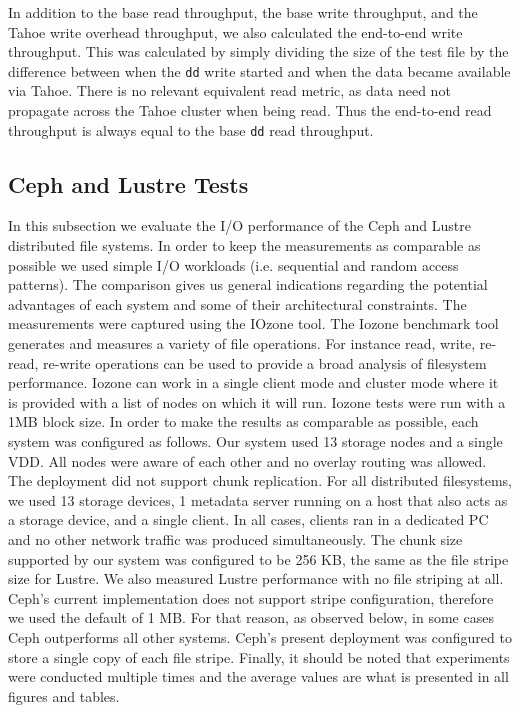 \documentclass[11pt]{article}
\begin{document}
In addition to the base read throughput, the base write throughput, and the Tahoe write
overhead throughput, we also calculated the end-to-end write
throughput. This was calculated by simply dividing the size of the
test file by the difference
between when the \texttt{dd} write started and when the data became
available via Tahoe. There is no relevant equivalent read metric, as data need
not propagate across the Tahoe cluster when being read. Thus the
end-to-end read throughput is always equal to the base \texttt{dd} read
throughput.

\subsection{Ceph and Lustre Tests}
In this subsection we evaluate the I/O performance of the Ceph and 
Lustre distributed file systems. In order to keep the measurements 
as comparable as possible we used simple I/O workloads (i.e. sequential 
and random access patterns). The comparison gives us general indications 
regarding the potential advantages of each system and some of their 
architectural constraints. The measurements were captured using the IOzone 
tool. The Iozone benchmark tool generates and measures a variety of file 
operations. For instance read, write, re-read, re-write operations can be 
used to provide a broad analysis of filesystem performance. Iozone can work 
in a single client mode and cluster mode where it is provided with a list of 
nodes on which it will run. Iozone tests were run with a 1MB block size.  
In order to make the results as comparable as possible, each system was 
configured as follows. Our system used 13 storage nodes and a single VDD. 
All nodes were aware of each other and no overlay routing was allowed. The 
deployment did not support chunk replication. For all distributed filesystems, 
we used 13 storage devices, 1 metadata server running on a host that also acts 
as a storage device, and a single client. In all cases, clients ran in a 
dedicated PC and no other network traffic was produced simultaneously. The 
chunk size supported by our system was configured to be 256 KB, the same 
as the file stripe size for Lustre. We also measured Lustre performance 
with no file striping at all. Ceph’s current implementation does not support 
stripe configuration, therefore we used the default of 1 MB. For that reason, 
as observed below, in some cases Ceph outperforms all other systems. Ceph’s 
present deployment was configured to store a single copy of each file stripe. 
Finally, it should be noted that experiments were conducted multiple times and 
the average values are what is presented in all figures and tables.
\end{document}
